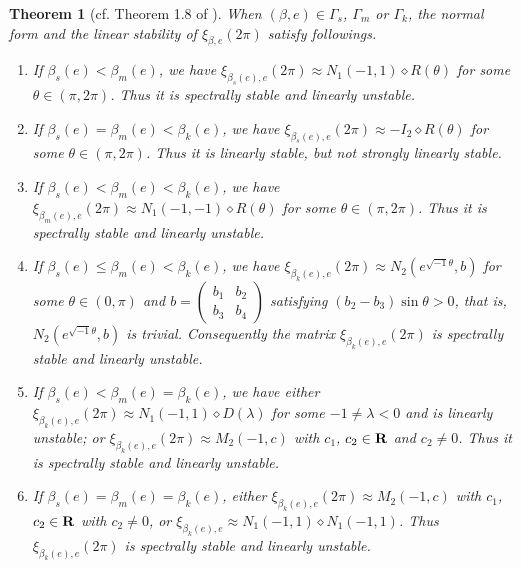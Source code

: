 \documentclass[11pt]{article}
\newtheorem{theorem}[lemma]{Theorem}
\def\lb{\label}
\def\R{{\bf R}}
\def\th{{\theta}}
\def\lm{{\lambda}}
\begin{document}
\begin{theorem}[cf. Theorem 1.8 of \cite{HLS}]\lb{thm:RE.lim}
	When $(\beta,e) \in \Gamma_s$, $\Gamma_m$ or $\Gamma_k$, the normal form and the linear stability of $\xi_{\beta,e}(2\pi)$ satisfy followings.
	\begin{enumerate}[label=(\roman*)]
		\item If $\beta_s(e) < \beta_m(e)$, we have $\xi_{\beta_{s}(e),e}(2\pi) \approx N_1(-1,1) \diamond R(\th)$ for some $\th\in (\pi,2\pi)$. Thus it is spectrally stable and linearly unstable.

		\item\lb{thm:RE.lim:k<s=m} If $\beta_s(e) = \beta_m(e) < \beta_k(e)$, we have $\xi_{\beta_{s}(e),e}(2\pi) \approx -I_2 \diamond R(\th)$ for some $\th\in (\pi,2\pi)$. Thus it is linearly stable, but not strongly linearly stable.

		\item If $\beta_s(e)<\beta_m(e) < \beta_k(e)$, we have $\xi_{\beta_{m}(e),e}(2\pi) \approx N_1(-1,-1)  \diamond R(\th)$ for some $\th\in (\pi,2\pi)$. Thus it is spectrally stable and linearly unstable.

		\item\lb{thm:RE.lim:k<s<=m} If $\beta_s(e) \leq \beta_m(e) < \beta_k(e)$, we have $\xi_{\beta_{k}(e),e}(2\pi) \approx N_2(e^{\sqrt{-1}\th},b)$ for some $\th\in (0,\pi)$ and $b= \begin{pmatrix}
		b_1 & b_2 \\ b_3 & b_4 \end{pmatrix}$
		satisfying $(b_2-b_3)\sin\th> 0$,
		that is, $N_2(e^{\sqrt{-1}\th},b)$ is
		trivial.
		Consequently the matrix $\xi_{\beta_{k}(e),e}(2\pi)$ is spectrally stable and linearly unstable.

		\item If $\beta_s(e) < \beta_m(e) = \beta_k(e)$,
		we have either $\xi_{\beta_{k}(e),e}(2\pi)  \approx N_1(-1,1)  \diamond D(\lm)$ for some $-1\neq \lm <0$
		and is linearly unstable; or $\xi_{\beta_{k}(e),e}(2\pi) \approx M_2(-1,c)$ with $c_1$, $c_2\in \R$ and $c_2 \neq 0$. Thus it is spectrally stable and linearly unstable.

		\item If $\beta_s(e) = \beta_m(e) = \beta_k(e)$, either $\xi_{\beta_{k}(e),e}(2\pi) \approx M_2(-1,c)$
		with $c_1$, $c_2\in \R$ with $c_2\neq 0$,
		or
		$\xi_{\beta_{k}(e),e} \approx N_1(-1, 1)\diamond N_1(-1, 1)$.
		Thus $\xi_{\beta_{k}(e),e}(2\pi)$ is spectrally stable and linearly unstable.
	\end{enumerate}
\end{theorem}
\end{document}
